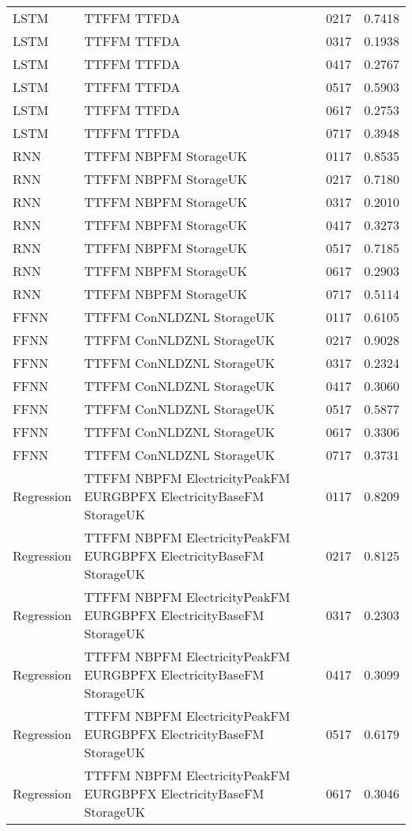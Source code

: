 \begin{table}[h!]
\begin{adjustbox}{max width=\textwidth}
\begin{tabular}{lllr}
  LSTM & TTFFM TTFDA & 0217 & 0.7418 \\ 
  LSTM & TTFFM TTFDA & 0317 & 0.1938 \\ 
  LSTM & TTFFM TTFDA & 0417 & 0.2767 \\ 
  LSTM & TTFFM TTFDA & 0517 & 0.5903 \\ 
  LSTM & TTFFM TTFDA & 0617 & 0.2753 \\ 
  LSTM & TTFFM TTFDA & 0717 & 0.3948 \\ 
  RNN & TTFFM NBPFM StorageUK & 0117 & 0.8535 \\ 
  RNN & TTFFM NBPFM StorageUK & 0217 & 0.7180 \\ 
  RNN & TTFFM NBPFM StorageUK & 0317 & 0.2010 \\ 
  RNN & TTFFM NBPFM StorageUK & 0417 & 0.3273 \\ 
  RNN & TTFFM NBPFM StorageUK & 0517 & 0.7185 \\ 
  RNN & TTFFM NBPFM StorageUK & 0617 & 0.2903 \\ 
  RNN & TTFFM NBPFM StorageUK & 0717 & 0.5114 \\ 
  FFNN & TTFFM ConNLDZNL StorageUK & 0117 & 0.6105 \\ 
  FFNN & TTFFM ConNLDZNL StorageUK & 0217 & 0.9028 \\ 
  FFNN & TTFFM ConNLDZNL StorageUK & 0317 & 0.2324 \\ 
  FFNN & TTFFM ConNLDZNL StorageUK & 0417 & 0.3060 \\ 
  FFNN & TTFFM ConNLDZNL StorageUK & 0517 & 0.5877 \\ 
  FFNN & TTFFM ConNLDZNL StorageUK & 0617 & 0.3306 \\ 
  FFNN & TTFFM ConNLDZNL StorageUK & 0717 & 0.3731 \\ 
  Regression & TTFFM NBPFM ElectricityPeakFM EURGBPFX ElectricityBaseFM StorageUK & 0117 & 0.8209 \\ 
  Regression & TTFFM NBPFM ElectricityPeakFM EURGBPFX ElectricityBaseFM StorageUK & 0217 & 0.8125 \\ 
  Regression & TTFFM NBPFM ElectricityPeakFM EURGBPFX ElectricityBaseFM StorageUK & 0317 & 0.2303 \\ 
  Regression & TTFFM NBPFM ElectricityPeakFM EURGBPFX ElectricityBaseFM StorageUK & 0417 & 0.3099 \\ 
  Regression & TTFFM NBPFM ElectricityPeakFM EURGBPFX ElectricityBaseFM StorageUK & 0517 & 0.6179 \\ 
  Regression & TTFFM NBPFM ElectricityPeakFM EURGBPFX ElectricityBaseFM StorageUK & 0617 & 0.3046 \\ 

\end{tabular}
\end{adjustbox}
\end{table}
